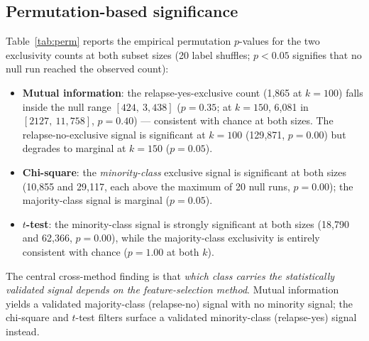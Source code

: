 \documentclass[twocolumn]{article}
\begin{document}
\subsection{Permutation-based significance}
\label{sec:res-perm}

Table~\ref{tab:perm} reports the empirical permutation $p$-values for the two
exclusivity counts at both subset sizes (20 label shuffles; $p < 0.05$
signifies that no null run reached the observed count):

\begin{itemize}
    \item \textbf{Mutual information}: the relapse-yes-exclusive count (1{,}865
    at $k{=}100$) falls inside the null range $[424,\ 3{,}438]$
    ($p = 0.35$; at $k{=}150$, 6{,}081 in $[2127,\ 11{,}758]$, $p = 0.40$) ---
    consistent with chance at both sizes. The relapse-no-exclusive signal is
    significant at $k{=}100$ (129{,}871, $p = 0.00$) but degrades to marginal
    at $k{=}150$ ($p = 0.05$).
    \item \textbf{Chi-square}: the \emph{minority-class} exclusive signal is
    significant at both sizes (10{,}855 and 29{,}117, each above the maximum of
    20 null runs, $p = 0.00$); the majority-class signal is marginal
    ($p = 0.05$).
    \item \textbf{$t$-test}: the minority-class signal is strongly significant
    at both sizes (18{,}790 and 62{,}366, $p = 0.00$), while the
    majority-class exclusivity is entirely consistent with chance ($p = 1.00$
    at both $k$).
\end{itemize}

The central cross-method finding is that \emph{which class carries the
statistically validated signal depends on the feature-selection method}.
Mutual information yields a validated majority-class (relapse-no) signal with
no minority signal; the chi-square and $t$-test filters surface a validated
minority-class (relapse-yes) signal instead.

\begin{table}[h]
\centering
\small
\caption{Empirical permutation $p$-values for class-exclusive itemset counts (20 label shuffles).}
\label{tab:perm}
\end{table}
\end{document}
